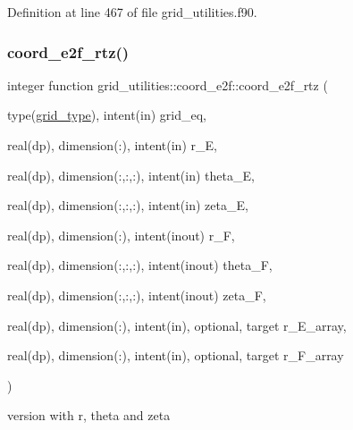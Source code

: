 Definition at line 467 of file grid\+\_\+utilities.\+f90.

\mbox{\label{interfacegrid__utilities_1_1coord__e2f_aa4cc89261b595ef43acdb171c448e7d5}} 
\subsubsection{\texorpdfstring{coord\+\_\+e2f\+\_\+rtz()}{coord\_e2f\_rtz()}}
{\footnotesize\ttfamily integer function grid\+\_\+utilities\+::coord\+\_\+e2f\+::coord\+\_\+e2f\+\_\+rtz (\begin{DoxyParamCaption}\item[{type(\hyperlink{structgrid__vars_1_1grid__type}{grid\+\_\+type}), intent(in)}]{grid\+\_\+eq,  }\item[{real(dp), dimension(\+:), intent(in)}]{r\+\_\+E,  }\item[{real(dp), dimension(\+:,\+:,\+:), intent(in)}]{theta\+\_\+E,  }\item[{real(dp), dimension(\+:,\+:,\+:), intent(in)}]{zeta\+\_\+E,  }\item[{real(dp), dimension(\+:), intent(inout)}]{r\+\_\+F,  }\item[{real(dp), dimension(\+:,\+:,\+:), intent(inout)}]{theta\+\_\+F,  }\item[{real(dp), dimension(\+:,\+:,\+:), intent(inout)}]{zeta\+\_\+F,  }\item[{real(dp), dimension(\+:), intent(in), optional, target}]{r\+\_\+\+E\+\_\+array,  }\item[{real(dp), dimension(\+:), intent(in), optional, target}]{r\+\_\+\+F\+\_\+array }\end{DoxyParamCaption})}



version with r, theta and zeta 


